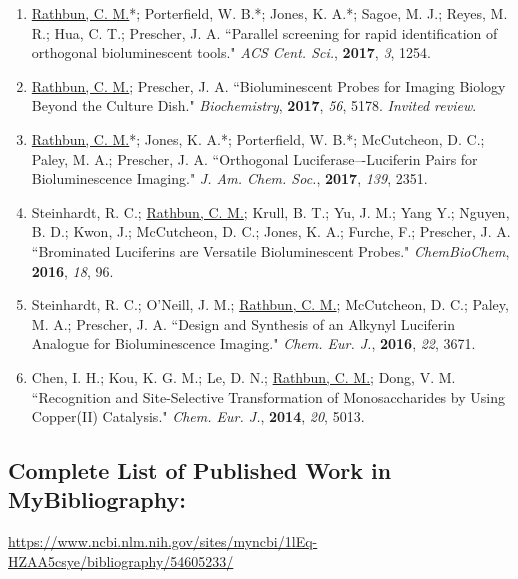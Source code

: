 \documentclass{nihbiosketch}
\begin{document}
\begin{enumerate}
\begin{enumerate}
  \item \underline{Rathbun, C. M.}*; Porterfield, W. B.*; Jones, K. A.*; Sagoe, M. J.; Reyes, M. R.; Hua, C. T.; Prescher, J. A. ``Parallel screening for rapid identification of orthogonal bioluminescent tools." \textit{ACS Cent. Sci.}, \textbf{2017}, \textit{3}, 1254.

  \item \underline{Rathbun, C. M.}; Prescher, J. A. ``Bioluminescent Probes for Imaging Biology Beyond the Culture Dish." \textit{Biochemistry}, \textbf{2017}, \textit{56}, 5178. \textit{Invited review}.

  \item \underline{Rathbun, C. M.}*; Jones, K. A.*; Porterfield, W. B.*; McCutcheon, D. C.; Paley, M. A.; Prescher, J. A. ``Orthogonal Luciferase–-Luciferin Pairs for Bioluminescence Imaging." \textit{J. Am. Chem. Soc.}, \textbf{2017}, \textit{139}, 2351.

  \item Steinhardt, R. C.; \underline{Rathbun, C. M.}; Krull, B. T.; Yu, J. M.; Yang Y.; Nguyen, B. D.; Kwon, J.; McCutcheon, D. C.; Jones, K. A.; Furche, F.; Prescher, J. A. ``Brominated Luciferins are Versatile Bioluminescent Probes." \textit{ChemBioChem}, \textbf{2016}, \textit{18}, 96. %

  \item Steinhardt, R. C.; O'Neill, J. M.; \underline{Rathbun, C. M.}; McCutcheon, D. C.; Paley, M. A.; Prescher, J. A. ``Design and Synthesis of an Alkynyl Luciferin Analogue for Bioluminescence Imaging." \textit{Chem. Eur. J.}, \textbf{2016}, \textit{22}, 3671.

  \item Chen, I. H.; Kou, K. G. M.; Le, D. N.; \underline{Rathbun, C. M.}; Dong, V. M. ``Recognition and Site-Selective Transformation of Monosaccharides by Using Copper(II) Catalysis." \textit{Chem. Eur. J.}, \textbf{2014}, \textit{20}, 5013. %

\end{enumerate}

\end{enumerate}

\subsection*{Complete List of Published Work in MyBibliography:}
\url{https://www.ncbi.nlm.nih.gov/sites/myncbi/1lEq-HZAA5csye/bibliography/54605233/}
\end{document}
